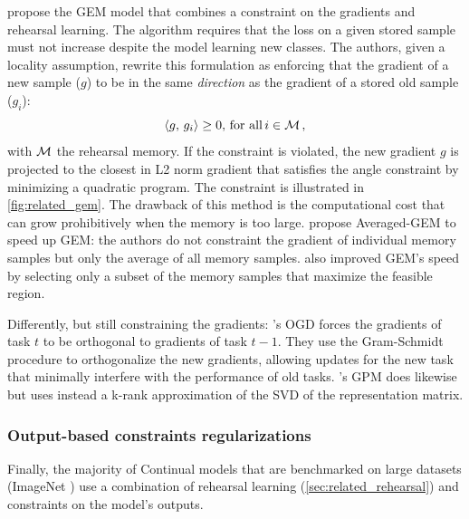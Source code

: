 \cite{lopezpaz2017gem} propose the GEM model that combines a constraint on the gradients and
rehearsal learning. The algorithm requires that the loss on a given stored sample must not increase
despite the model learning new classes. The authors, given a locality assumption, rewrite this
formulation as enforcing that the gradient of a new sample ($g$) to be in the same \textit{direction} as
the gradient of a stored old sample ($g_i$):
%
\begin{equation}
      \langle g,\, g_i\rangle \ge 0,\, \text{for all}\, i \in \mathcal{M}\,,
\end{equation}
%
\noindent with $\mathcal{M}$ the rehearsal memory. If the constraint is violated, the new gradient $g$ is
projected to the closest in L2 norm gradient that satisfies the angle constraint by minimizing a
quadratic program. The constraint is illustrated in \autoref{fig:related_gem}. The drawback of this
method is the computational cost that can grow prohibitively when the memory is too large.
\cite{chaudhry2019AGEM} propose Averaged-GEM to speed up GEM: the authors do not constraint the
gradient of individual memory samples but only the average of all memory samples.
\cite{aljundi2019gradientselection} also improved GEM's speed by selecting only a subset of the
memory samples that maximize the feasible region.

Differently, but still constraining the gradients: \cite{farajtabar2020ogd}'s OGD forces the gradients of
task $t$ to be orthogonal to gradients of task $t-1$. They use the Gram-Schmidt procedure to
orthogonalize the new gradients, allowing updates for the new task that minimally interfere with the
performance of old tasks. \cite{saha2021gpm}'s GPM does likewise but uses instead a k-rank
approximation of the SVD of the representation matrix.


\subsubsection{Output-based constraints regularizations}
\label{sec:related_regul_output}

Finally, the majority of Continual models that are benchmarked on large datasets (\eg ImageNet
\citep{deng2009imagenet}) use a combination of rehearsal
learning (\autoref{sec:related_rehearsal}) and constraints on the model's outputs.

